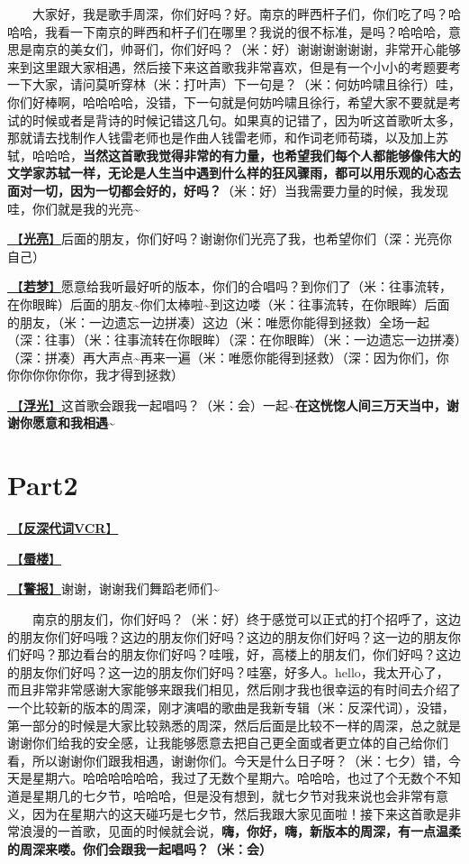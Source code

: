 \documentclass[]{ctexbook}
\begin{document}
  大家好，我是歌手周深，你们好吗？好。南京的畔西杆子们，你们吃了吗？哈哈哈，我看一下南京的畔西和杆子们在哪里？我说的很不标准，是吗？哈哈哈，意思是南京的美女们，帅哥们，你们好吗？（米：好）谢谢谢谢谢谢，非常开心能够来到这里跟大家相遇，然后接下来这首歌我非常喜欢，但是有一个小小的考题要考一下大家，请问莫听穿林（米：打叶声）下一句是？（米：何妨吟啸且徐行）哇，你们好棒啊，哈哈哈哈，没错，下一句就是何妨吟啸且徐行，希望大家不要就是考试的时候或者是背诗的时候记错这几句。如果真的记错了，因为听这首歌听太多，那就请去找制作人钱雷老师也是作曲人钱雷老师，和作词老师苟璘，以及加上苏轼，哈哈哈，\textbf{当然这首歌我觉得非常的有力量，也希望我们每个人都能够像伟大的文学家苏轼一样，无论是人生当中遇到什么样的狂风骤雨，都可以用乐观的心态去面对一切，因为一切都会好的，好吗？}（米：好）当我需要力量的时候，我发现哇，你们就是我的光亮\textasciitilde{}

\hyperref[silver-linings]{🎵【\textbf{光亮}】}后面的朋友，你们好吗？谢谢你们光亮了我，也希望你们（深：光亮你自己）

\hyperref[ruomeng]{🎵【\textbf{若梦}】}愿意给我听最好听的版本，你们的合唱吗？到你们了（米：往事流转，在你眼眸）后面的朋友\textasciitilde 你们太棒啦\textasciitilde 到这边喽（米：往事流转，在你眼眸）后面的朋友，（米：一边遗忘一边拼凑）这边（米：唯愿你能得到拯救）全场一起（深：往事）（米：往事流转在你眼眸）（深：在你眼眸）（米：一边遗忘一边拼凑）（深：拼凑）再大声点\textasciitilde 再来一遍（米：唯愿你能得到拯救）（深：因为你们，你你你你你你你，我才得到拯救）

\hyperref[floating-light]{🎵【\textbf{浮光}】}这首歌会跟我一起唱吗？（米：会）一起\textasciitilde{}\textbf{在这恍惚人间三万天当中，谢谢你愿意和我相遇\textasciitilde{}}

\section{Part2}\label{nanjing-20240810-part2}

\hyperref[senself-vcr]{🎥【\textbf{反深代词VCR}】}

\hyperref[mirage]{🎵【\textbf{蜃楼}】}

\hyperref[the-giver]{🎵【\textbf{警报}】}谢谢，谢谢我们舞蹈老师们\textasciitilde{}

  南京的朋友们，你们好吗？（米：好）终于感觉可以正式的打个招呼了，这边的朋友你们好吗哦？这边的朋友你们好吗？这边的朋友你们好吗？这一边的朋友你们好吗？那边看台的朋友你们好吗？哇哦，好，高楼上的朋友们，你们好吗？这边的朋友你们好吗？这一边的朋友你们好吗？哇塞，好多人。hello，我太开心了，而且非常非常感谢大家能够来跟我们相见，然后刚才我也很幸运的有时间去介绍了一个比较新的版本的周深，刚才演唱的歌曲是我新专辑（米：反深代词），没错，第一部分的时候是大家比较熟悉的周深，然后后面是比较不一样的周深，总之就是谢谢你们给我的安全感，让我能够愿意去把自己更全面或者更立体的自己给你们看，所以谢谢你们跟我相遇，谢谢你们。今天是什么日子呀？（米：七夕）错，今天是星期六。哈哈哈哈哈哈，我过了无数个星期六。哈哈哈，也过了个无数个不知道是星期几的七夕节，哈哈哈，但是没有想到，就七夕节对我来说也会非常有意义，因为在星期六的这天碰巧是七夕节，然后我跟大家见面啦！接下来这首歌是非常浪漫的一首歌，见面的时候就会说，\textbf{嗨，你好，嗨，新版本的周深，有一点温柔的周深来喽。你们会跟我一起唱吗？（米：会）}
\end{document}
